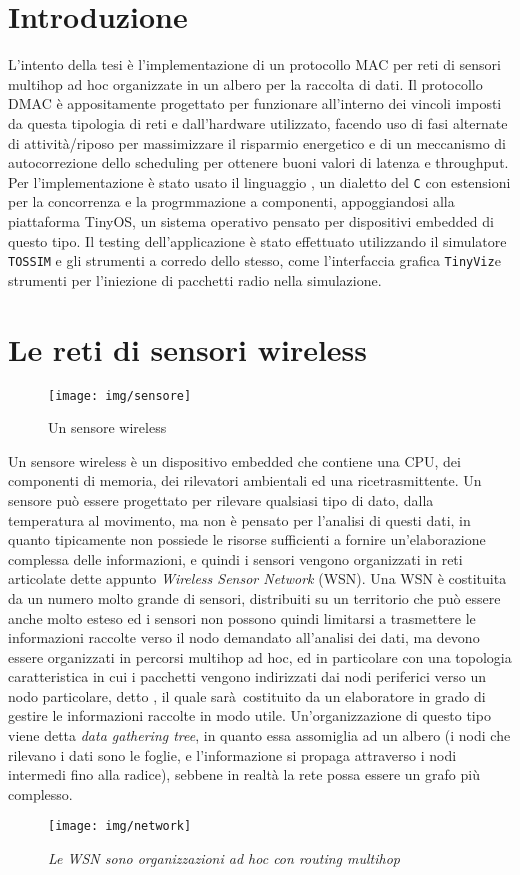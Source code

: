 \documentclass[twoside,11pt,a4paper,italian,openany]{book}
\newcommand{\tv}{\texttt{TinyViz}}
\newcommand{\tos}{\texttt{TOSSIM} }
\begin{document}
\chapter{Introduzione}
L'intento della tesi è l'implementazione di un protocollo MAC per reti di sensori 
multihop ad hoc organizzate in un albero per la raccolta di dati.
Il protocollo DMAC è appositamente progettato per funzionare all'interno dei vincoli 
imposti da questa tipologia di reti e dall'hardware utilizzato, 
facendo uso di fasi alternate di attività/riposo per massimizzare 
il risparmio energetico e di un meccanismo di autocorrezione dello scheduling per 
ottenere buoni valori di latenza e throughput.
Per l'implementazione è stato usato il linguaggio \nesc, un dialetto del \texttt{C}
con estensioni per la concorrenza e la progrmmazione a componenti, 
appoggiandosi alla piattaforma TinyOS, un sistema operativo pensato per dispositivi embedded di questo tipo.  Il testing dell'applicazione è stato effettuato utilizzando il simulatore \tos  
e gli strumenti a corredo dello stesso, come l'interfaccia grafica \tv e strumenti 
per l'iniezione di pacchetti radio nella simulazione.



\chapter{Le reti di sensori wireless}
\begin{figure}
\caption{Un sensore wireless}
\texttt{[image: img/sensore]}
\end{figure}

Un sensore wireless è un dispositivo embedded che contiene una CPU, dei componenti di memoria, 
dei rilevatori ambientali  ed una ricetrasmittente. Un sensore può essere progettato per 
rilevare qualsiasi tipo di dato, dalla temperatura al movimento, ma non è pensato per l'analisi 
di questi dati, in quanto tipicamente non possiede le risorse sufficienti a fornire 
un'elaborazione complessa delle informazioni, e quindi i sensori vengono organizzati 
in reti articolate dette appunto \emph{Wireless Sensor Network} (WSN).
Una WSN è costituita da un numero molto grande di sensori, distribuiti su un territorio che può essere anche molto esteso ed i sensori non possono quindi limitarsi a trasmettere 
le informazioni raccolte verso il nodo demandato all'analisi dei dati, ma devono essere 
organizzati in percorsi multihop ad hoc, ed in particolare con una topologia caratteristica in 
cui i pacchetti vengono indirizzati dai nodi periferici verso un nodo particolare, detto \sink, 
il quale sarà costituito da un elaboratore in grado di gestire le informazioni raccolte 
in modo utile. Un'organizzazione di questo tipo viene detta \emph{data gathering tree}, 
in quanto essa assomiglia ad un albero (i nodi che rilevano i dati sono le foglie, e 
l'informazione si propaga attraverso i nodi intermedi fino alla radice), sebbene in realtà 
la rete possa essere un grafo più complesso. 
\begin{figure}
\caption{\emph{Le WSN sono organizzazioni ad hoc con routing multihop}}
\texttt{[image: img/network]}
\end{figure}
\end{document}
